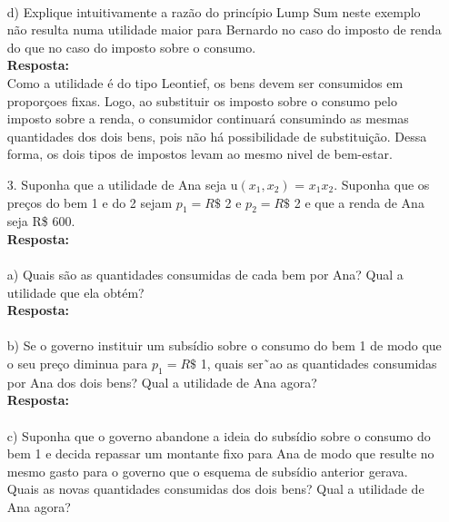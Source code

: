\begin{enumerate}
\paragraph{} d) Explique intuitivamente a razão do princípio Lump Sum neste exemplo não resulta numa
utilidade maior para Bernardo no caso do imposto de renda do que no caso do imposto sobre o consumo.\\

\textbf{Resposta:}\\

Como a utilidade é do tipo Leontief, os bens devem ser consumidos em proporçoes fixas. Logo, ao substituir os imposto sobre o consumo pelo imposto sobre a renda, o consumidor continuará consumindo as mesmas quantidades dos dois bens, pois não há possibilidade de substituição. Dessa forma, os dois tipos de impostos levam ao mesmo nivel de bem-estar. 

\item[3.] Suponha que a utilidade de Ana seja u{$(x_1, x_2)$} = {$x_1x_2$}. Suponha que os preços do bem 1 e do 2 sejam {$p_1 = R\$ $} 2 e {$p_2 = R\$ $} 2 e que a renda de Ana seja R\$ 600.\\

\textbf{Resposta:}\\

\paragraph{} a) Quais são as quantidades consumidas de cada bem por Ana? Qual a utilidade que ela
obtém?\\

\textbf{Resposta:}\\

\paragraph{} b) Se o governo instituir um subsídio sobre o consumo do bem 1 de modo que o seu preço
diminua para {$p_1 = R\$ $} 1, quais ser˜ao as quantidades consumidas por Ana dos dois bens? Qual a utilidade de Ana agora?\\

\textbf{Resposta:}\\

\paragraph{} c) Suponha que o governo abandone a ideia do subsídio sobre o consumo do bem 1 e decida
repassar um montante fixo para Ana de modo que resulte no mesmo gasto para o governo que o esquema de subsídio anterior gerava. Quais as novas quantidades consumidas dos dois bens? Qual a utilidade de Ana agora?\\


\end{enumerate}
